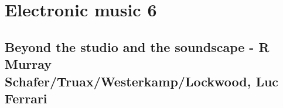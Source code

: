 
\chapter{Electronic music 6}
\label{history6}

\section{Beyond the studio and the soundscape - R Murray Schafer/Truax/Westerkamp/Lockwood, Luc Ferrari}




